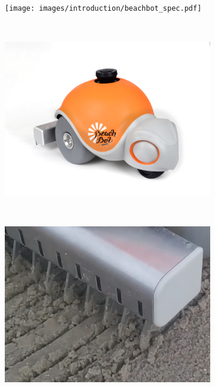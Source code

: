 \begin{figure}
\centering
\begin{subfigure}[c]{1\textwidth}
\texttt{[image: images/introduction/beachbot\_spec.pdf]} 
\end{subfigure}
\\
\begin{subfigure}[c]{0.8\textwidth}
\includegraphics[width=\textwidth]{images/introduction/final_shell_scaled_down.jpg} 
\end{subfigure}
\\
\vspace{2cm}
\begin{subfigure}[c]{0.46\textwidth}
\includegraphics[width=\textwidth]{images/introduction/localization_precision.png} 

\end{subfigure}
\end{figure}
